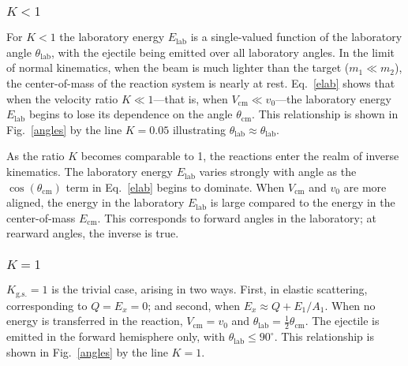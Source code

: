 \subsubsection{$K<1$}
For $K<1$ the laboratory energy $E_\mathrm{lab}$ is a single-valued function of the laboratory angle $\theta_\mathrm{lab}$, with the ejectile being emitted over all laboratory angles.  In the limit of normal kinematics, %
when the beam is much lighter than the target ($m_1 \ll m_2$), the center-of-mass of the reaction system is nearly at rest.  Eq.~\ref{elab} shows that when the velocity ratio $K \ll 1$---that is, when $V_\mathrm{cm} \ll v_0$---the laboratory energy $E_\mathrm{lab}$ begins to lose its dependence on the angle $\theta_\mathrm{cm}$.  This relationship is shown in Fig.~\ref{angles} by the line $K=0.05$ illustrating $\theta_\mathrm{lab}\approx \theta_\mathrm{lab}$.
  
As the ratio $K$ becomes comparable to 1, the reactions enter the realm of inverse kinematics.  The laboratory energy $E_\mathrm{lab}$ varies strongly with angle as the $\cos (\theta_\mathrm{cm})$ term in Eq.~\ref{elab} begins to dominate.  When $V_\mathrm{cm}$ and $v_0$ are more aligned, the energy in the laboratory $E_\mathrm{lab}$ is large compared to the energy in the center-of-mass $E_\mathrm{cm}$.  This corresponds to forward angles in the laboratory; at rearward angles, the inverse is true. 

\subsubsection{$K=1$}
\label{kisone}
$K_\mathrm{g.s.}=1$ is the trivial case, arising in two ways.  First, in elastic scattering, corresponding to $Q=E_x=0$; and second, when $E_x\approx Q+E_1/A_1$.  When no energy is transferred in the reaction, $V_\mathrm{cm}=v_0$ and $\theta_\mathrm{lab}=\frac{1}{2}\theta_\mathrm{cm}$.  The ejectile is emitted in the forward hemisphere only, with $\theta_\textrm{lab} \leq 90^\circ$.  This relationship is shown in Fig.~\ref{angles} by the line $K=1$.
